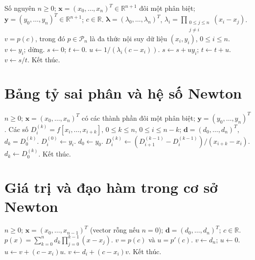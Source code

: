 \documentclass[12pt,a4paper,oneside]{book}
\numberwithin{algorithm}{chapter}
\theoremstyle{definition}
\newcommand{\R}{\mathbb{R}}
\begin{document}
\begin{algorithm}[H]
\caption{Tính giá trị đa thức nội suy tại $c$ theo dạng tỷ số -- chi tiết}
\label{alg:barycentric-evaluate}
\begin{algorithmic}[1]
\Require Số nguyên $n\geq0$; $\boldsymbol x=(x_0,\ldots,x_n)^T\in\R^{n+1}$ đôi một phân biệt; $\boldsymbol y=(y_0,\ldots,y_n)^T\in\R^{n+1}$; $c\in\R$. $\boldsymbol\lambda=(\lambda_0,\ldots,\lambda_n)^T$, $\lambda_i=\prod_{\substack{0\leq j\leq n\\j\ne i}}(x_i-x_j)$.
\Ensure $v=p(c)$, trong đó $p\in\mathcal P_n$ là đa thức nội suy dữ liệu $(x_i,y_i)$, $0\leq i\leq n$.
    \State $v\gets y_i$; dừng.
  \EndIf
\EndFor
\Statex
\State $s\gets0$; $t\gets0$.
  \State $u\gets1/(\lambda_i(c-x_i))$.
  \State $s\gets s+uy_i$; $t\gets t+u$.
\EndFor
\Statex
\State $v\gets s/t$.
\State Kết thúc.
\end{algorithmic}
\end{algorithm}

\section{Bảng tỷ sai phân và hệ số Newton}
\begin{algorithm}[H]
\caption{Dựng bảng tỷ sai phân}
\label{alg:newton-table}
\begin{algorithmic}[1]
\Require $n\geq0$; $\boldsymbol x=(x_0,\ldots,x_n)^T$ có các thành phần đôi một phân biệt; $\boldsymbol y=(y_0,\ldots,y_n)^T$.
\Ensure Các số $D_i^{(k)}=f[x_i,\ldots,x_{i+k}]$, $0\leq k\leq n$, $0\leq i\leq n-k$; $\boldsymbol d=(d_0,\ldots,d_n)^T$, $d_k=D_0^{(k)}$.
 \State $D_i^{(0)}\gets y_i$.
\EndFor
\Statex
\State $d_0\gets y_0$.
  \State $D_i^{(k)}\gets(D_{i+1}^{(k-1)}-D_i^{(k-1)})/(x_{i+k}-x_i)$.
 \EndFor
 \State $d_k\gets D_0^{(k)}$.
\EndFor
\Statex
\State Kết thúc.
\end{algorithmic}
\end{algorithm}

\section{Giá trị và đạo hàm trong cơ sở Newton}
\begin{algorithm}[H]
\caption{Horner trong cơ sở Newton}
\label{alg:newton-eval}
\begin{algorithmic}[1]
\Require $n\geq0$; $\boldsymbol x=(x_0,\ldots,x_{n-1})^T$ (vector rỗng nếu $n=0$); $\boldsymbol d=(d_0,\ldots,d_n)^T$; $c\in\R$. $p(x)=\sum_{k=0}^{n}d_k\prod_{j=0}^{k-1}(x-x_j)$.
\Ensure $v=p(c)$ và $u=p'(c)$.
\State $v\gets d_n$; $u\gets0$.
 \State $u\gets v+(c-x_i)u$.
 \State $v\gets d_i+(c-x_i)v$.
\EndFor
\Statex
\State Kết thúc.
\end{algorithmic}
\end{algorithm}
\end{document}
